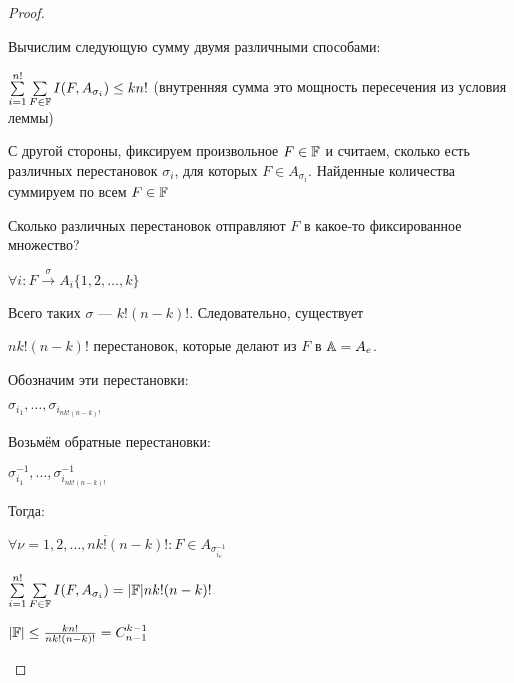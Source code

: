 \begin{proof}
\begin{enumerate}
Вычислим следующую сумму двумя различными способами:

$\sum \limits _{i=1} ^{n!} \sum \limits _{F \in \mathbb{F}} I(F, A_{\sigma_i} )\leq k n!$ (внутренняя сумма это мощность пересечения из условия леммы)

С другой стороны, фиксируем произвольное $F \in \mathbb{F}$ и считаем, сколько есть различных перестановок $\sigma_i$, для которых $F \in A_{\sigma_i}$. Найденные количества суммируем по всем $F \in \mathbb{F}$

Сколько различных перестановок отправляют $F$ в какое-то фиксированное множество?

$\forall i : F \xrightarrow{\sigma} A_i \{1,2, \dots, k\}$

Всего таких $ \sigma $ --- $k! (n-k)!$. Следовательно, существует

$n k! (n-k)!$ перестановок, которые делают из $F$ в $\mathbb{A} = A_e$.

Обозначим эти перестановки:

$\sigma_{i_1}, \dots, \sigma_{i_{nk!(n-k)!}}$

Возьмём обратные перестановки:

$\sigma_{i_1}^{-1}, \dots, \sigma_{i_{nk!(n-k)!}} ^{-1}$

Тогда:

$\forall \nu = \overline{1,2,\dots, nk!(n-k)!} :F \in A_{\sigma_{i_\nu}^{-1}} $

$\sum \limits _{i=1} ^{n!} \sum \limits _{F \in \mathbb{F}} I(F, A_{\sigma_i} )= |\mathbb{F}| nk! (n-k)! $

$|\mathbb{F}| \leq \frac {kn!} {nk!(n-k)!} = C_{n-1}^{k-1}$
 
\end{enumerate}

\end{proof}
